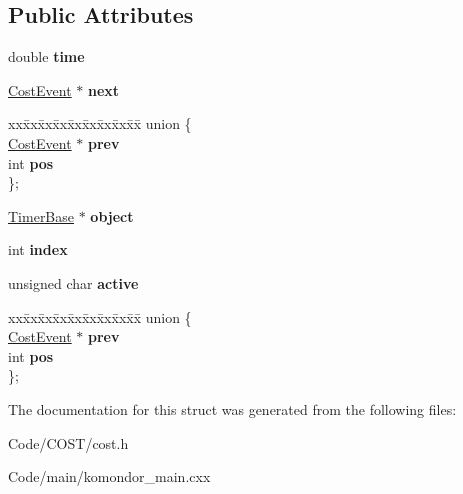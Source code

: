 \subsection*{Public Attributes}
\begin{DoxyCompactItemize}
\item 
\mbox{\label{structCostEvent_ac0746284298c10df5f305d94b353c587}} 
double {\bfseries time}
\item 
\mbox{\label{structCostEvent_ad252572a43fe01fa65fb73a679f74640}} 
\hyperlink{structCostEvent}{Cost\+Event} $\ast$ {\bfseries next}
\item 
\mbox{\label{structCostEvent_ac6bb415ac9c3afd38e0295e560587f9d}} 
\begin{tabbing}
xx\=xx\=xx\=xx\=xx\=xx\=xx\=xx\=xx\=\kill
union \{\\
\>\hyperlink{structCostEvent}{CostEvent} $\ast$ {\bfseries prev}\\
\>int {\bfseries pos}\\
\}; \\

\end{tabbing}\item 
\mbox{\label{structCostEvent_aa17433641d852830e1537de27e4bae65}} 
\hyperlink{classTimerBase}{Timer\+Base} $\ast$ {\bfseries object}
\item 
\mbox{\label{structCostEvent_a1947f879e5dfa6aa53506b8b2cc3dd23}} 
int {\bfseries index}
\item 
\mbox{\label{structCostEvent_ab092e816e4e80e4d0b602e2bb5233be1}} 
unsigned char {\bfseries active}
\item 
\mbox{\label{structCostEvent_ad64bfe55cafcbe5c1d553d5cfabc73f1}} 
\begin{tabbing}
xx\=xx\=xx\=xx\=xx\=xx\=xx\=xx\=xx\=\kill
union \{\\
\>\hyperlink{structCostEvent}{CostEvent} $\ast$ {\bfseries prev}\\
\>int {\bfseries pos}\\
\}; \\

\end{tabbing}\end{DoxyCompactItemize}


The documentation for this struct was generated from the following files\+:\begin{DoxyCompactItemize}
\item 
Code/\+C\+O\+S\+T/cost.\+h\item 
Code/main/komondor\+\_\+main.\+cxx\end{DoxyCompactItemize}

